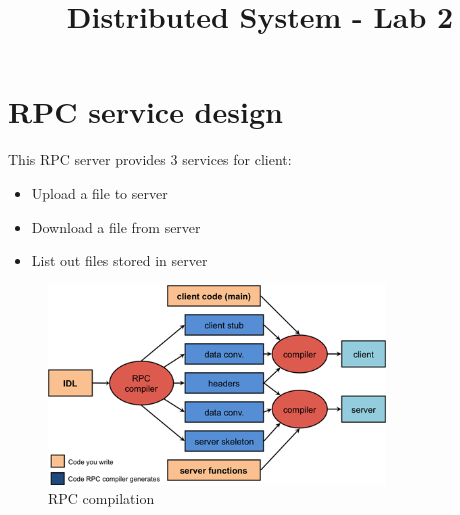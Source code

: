 \documentclass{article}
\title{Distributed System - Lab 2}
\begin{document}
\maketitle

\section{RPC service design}
    This RPC server provides 3 services for client:
    \begin{itemize}
        \item Upload a file to server
        \item Download a file from server
        \item List out files stored in server
    \end{itemize}
    \begin{figure}[h]
        \centering
        \includegraphics[width=\textwidth,height=200px]{image/rpc-compilation.png}
        \caption{RPC compilation}
        \label{fig:my_label}
    \end{figure}
\end{document}
